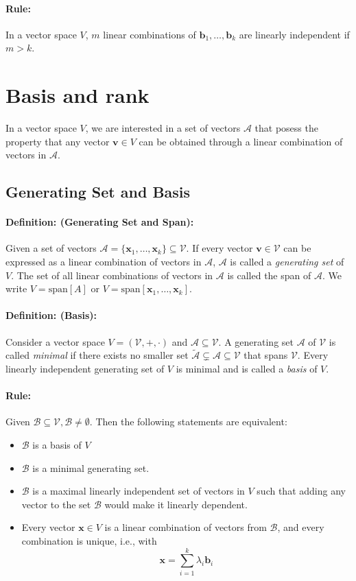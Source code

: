 \documentclass[12pt]{article}
\newcommand{\vecs}[2]{{\bm{#1}_1, \dots, \bm{#1}_#2}}
\newcommand{\xdefinition}[2]{\paragraph{\colorbox{#1!30}{\textbf{Definition:}} (#2):}}
\newcommand{\xrule}[1]{\paragraph{\colorbox{#1!30}{\textbf{Rule:}}}}
\newcommand{\mc}[1]{\mathcal{#1}}
\begin{document}
\xrule{red} In a vector space $V$, $m$ linear combinations of $\vecs{b}{k}$ are linearly independent if $m > k$. 

\section{Basis and rank}

In a vector space $V$, we are interested in a set of vectors $\mathcal{A}$ that posess the property that any vector $\bm{v} \in V$ can be obtained through a linear combination of vectors in $\mathcal{A}$.

\subsection{Generating Set and Basis}

\xdefinition{blue}{Generating Set and Span} Given a set of vectors $\mc{A} = \{ \vecs{x}{k} \} \subseteq \mc{V}$. If every vector $\bm{v} \in \mc{V}$ can be expressed as a linear combination of vectors in $\mc{A}$, $\mc{A}$ is called a \textit{generating set} of $V$.	The set of all linear combinations of vectors in $\mc{A}$ is called the span of $\mc{A}$. We write $V = \text{span}[A]$ or $V = \text{span}[\vecs{x}{k}]$.

\xdefinition{red}{Basis} Consider a vector space $V = (\mc{V}, +, \cdot)$ and $\mc{A} \subseteq \mc{V}$. A generating set $\mc{A}$ of $\mc{V}$ is called \textit{minimal} if there exists no smaller set $\tilde{\mc{A}} \subsetneq \mc{A} \subseteq \mc{V}$ that spans $\mc{V}$. Every linearly independent generating set of $V$ is minimal and is called a \textit{basis} of $V$.

\xrule{red} Given $\mc{B} \subseteq \mc{V}, \mc{B} \neq \emptyset$. Then the following statements are equivalent:
%
\begin{itemize}
	\item $\mc{B}$ is a basis of $V$
	\item $\mc{B}$ is a minimal generating set.
	\item $\mc{B}$ is a maximal linearly independent set of vectors in $V$ such that adding any vector to the set $\mc{B}$ would make it linearly dependent. 
	\item Every vector $\bm{x} \in V$ is a linear combination of vectors from $\mc{B}$, and every combination is unique, i.e., with
		\begin{equation}
			\bm{x} = \sum\limits_{i=1}^{k} \lambda_i \bm{b}_i
		\end{equation}
\end{itemize}
\end{document}
